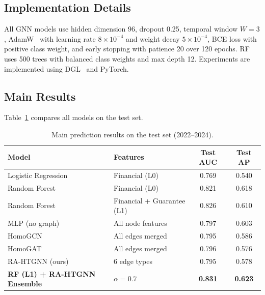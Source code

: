 \documentclass[3p,times,procedia]{elsarticle}
\begin{document}
\subsection{Implementation Details}
\label{subsec:impl}

All GNN models use hidden dimension 96, dropout 0.25, temporal window $W=3$, AdamW~\cite{loshchilov2019decoupled} with learning rate $8\times10^{-4}$ and weight decay $5\times10^{-4}$, BCE loss with positive class weight, and early stopping with patience 20 over 120 epochs.
RF uses 500 trees with balanced class weights and max depth 12.
Experiments are implemented using DGL~\cite{wang2019dgl} and PyTorch.


\subsection{Main Results}
\label{subsec:main_results}

Table~\ref{tab:main_results} compares all models on the test set.

\begin{table}[htbp]
\centering
\caption{Main prediction results on the test set (2022--2024).}\label{tab:main_results}
\begin{tabular}{@{}llcc@{}}
\toprule
Model & Features & Test AUC & Test AP \\
\midrule
Logistic Regression & Financial (L0) & 0.769 & 0.540 \\
Random Forest & Financial (L0) & 0.821 & 0.618 \\
Random Forest & Financial + Guarantee (L1) & 0.826 & 0.610 \\
\midrule
MLP (no graph) & All node features & 0.797 & 0.603 \\
HomoGCN & All edges merged & 0.795 & 0.586 \\
HomoGAT & All edges merged & 0.796 & 0.576 \\
RA-HTGNN (ours) & 6 edge types & 0.795 & 0.578 \\
\midrule
\textbf{RF (L1) + RA-HTGNN Ensemble} & $\alpha=0.7$ & \textbf{0.831} & \textbf{0.623} \\
\bottomrule
\end{tabular}
\end{table}
\end{document}
